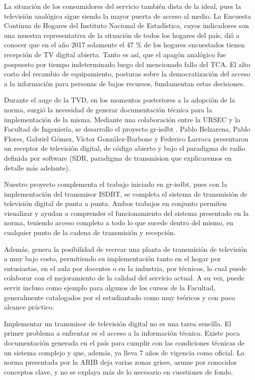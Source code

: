 La situación de los consumidores del servicio también dista de la ideal, pues la televisión analógica sigue siendo la mayor puerta de acceso al medio. La Encuesta Continua de Hogares del Instituto Nacional de Estadística\cite{ine2017}, cuyos indicadores son una muestra representativa de la situación de todos los hogares del país, dió a conocer que en el año 2017 solamente el 47 \% de los hogares encuestados tienen recepción de TV digital abierta. Tanto es así, que el apagón analógico fue pospuesto por tiempo indeterminado luego del mencionado fallo del TCA. El alto costo del recambio de equipamiento, posturas sobre la democratización del acceso a la información para personas de bajos recursos, fundamentan estas decisiones.

Durante el auge de la TVD, en los momentos posteriores a la adopción de la norma, surgió la necesidad de generar documentación técnica para la implementación de la misma. Mediante una colaboración entre la URSEC y la Facultad de Ingeniería, se desarrollo el proyecto gr-isdbt \cite{winCom16}. Pablo Belzarena, Pablo Flores, Gabriel Gómez, Víctor González-Barbone y Federico Larroca presentaron un receptor de televisión digital, de código abierto y bajo el paradigma de radio definida por software (SDR, paradigma de transmision que explicaremos en detalle más adelante).

Nuestro proyecto complementa el trabajo iniciado en gr-isdbt, pues con la implementación del transmisor ISDBT, se completa el sistema de transmisión de televisión digital de punta a punta. Ambos trabajos en conjunto permiten visualizar y ayudan a comprender el funcionamiento del sistema presentado en la norma, teniendo acceso completo a todo lo que sucede dentro del mismo, en cualquier punto de la cadena de transmisión y recepción. 

Además, genera la posibilidad de recrear una planta de transmisión de televisión a muy bajo costo, permitiendo su implementación tanto en el hogar por entusiastas, en el aula por docentes o en la industria, por técnicos, lo cual puede colaborar con el mejoramiento de la calidad del servicio actual. A su vez, puede servir incluso como ejemplo para algunos de los cursos de la Facultad, generalmente catalogados por el estudiantado como muy teóricos y con poco alcance práctico. 

Implementar un transmisor de televisión digital no es una tarea sencilla. El primer problema a enfrentar es el acceso a la información técnica. Existe poca documentación generada en el país para cumplir con las condiciones técnicas de un sistema complejo y que, además, ya lleva 7 años de vigencia como oficial. La norma presentada por la ARIB deja varias zonas grises, asume por conocidos conceptos clave, y no se explaya más de lo necesario en cuestiones de fondo. 

